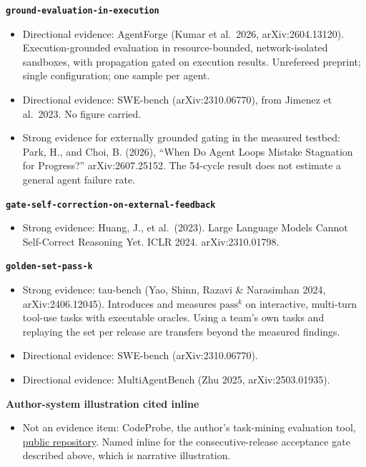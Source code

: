\textbf{\texttt{ground-evaluation-in-execution}}

\begin{itemize}
\tightlist
\item
  Directional evidence: AgentForge (Kumar et al.~2026, arXiv:2604.13120). Execution-grounded evaluation in resource-bounded, network-isolated sandboxes, with propagation gated on execution results. Unrefereed preprint; single configuration; one sample per agent.
\item
  Directional evidence: SWE-bench (arXiv:2310.06770), from Jimenez et al.~2023. No figure carried.
\item
  Strong evidence for externally grounded gating in the measured testbed: Park, H., and Choi, B. (2026), ``When Do Agent Loops Mistake Stagnation for Progress?'' arXiv:2607.25152. The 54-cycle result does not estimate a general agent failure rate.
\end{itemize}

\textbf{\texttt{gate-self-correction-on-external-feedback}}

\begin{itemize}
\tightlist
\item
  Strong evidence: Huang, J., et al.~(2023). Large Language Models Cannot Self-Correct Reasoning Yet. ICLR 2024. arXiv:2310.01798.
\end{itemize}

\textbf{\texttt{golden-set-pass-k}}

\begin{itemize}
\tightlist
\item
  Strong evidence: tau-bench (Yao, Shinn, Razavi \& Narasimhan 2024, arXiv:2406.12045). Introduces and measures \(\mathrm{pass}^{k}\) on interactive, multi-turn tool-use tasks with executable oracles. Using a team's own tasks and replaying the set per release are transfers beyond the measured findings.
\item
  Directional evidence: SWE-bench (arXiv:2310.06770).
\item
  Directional evidence: MultiAgentBench (Zhu 2025, arXiv:2503.01935).
\end{itemize}

\textbf{Author-system illustration cited inline}

\begin{itemize}
\tightlist
\item
  Not an evidence item: CodeProbe, the author's task-mining evaluation tool, \href{https://github.com/sjarmak/codeprobe}{public repository}. Named inline for the consecutive-release acceptance gate described above, which is narrative illustration.
\end{itemize}
